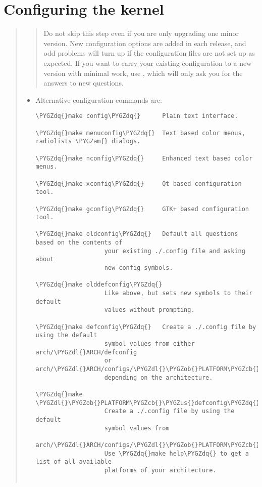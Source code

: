\documentclass[a4paper,8pt,english]{sphinxmanual}
\def\PYGZus{\char`\_}
\def\PYGZob{\char`\{}
\def\PYGZcb{\char`\}}
\def\PYGZam{\char`\&}
\def\PYGZdl{\char`\$}
\def\PYGZdq{\char`\"}
\begin{document}
\section{Configuring the kernel}
\label{admin-guide/README:configuring-the-kernel}\begin{quote}
\begin{quote}

Do not skip this step even if you are only upgrading one minor
version.  New configuration options are added in each release, and
odd problems will turn up if the configuration files are not set up
as expected.  If you want to carry your existing configuration to a
new version with minimal work, use , which will
only ask you for the answers to new questions.
\end{quote}
\begin{itemize}
\item {} 
Alternative configuration commands are:

\begin{Verbatim}[commandchars=\\\{\}]
\PYGZdq{}make config\PYGZdq{}      Plain text interface.

\PYGZdq{}make menuconfig\PYGZdq{}  Text based color menus, radiolists \PYGZam{} dialogs.

\PYGZdq{}make nconfig\PYGZdq{}     Enhanced text based color menus.

\PYGZdq{}make xconfig\PYGZdq{}     Qt based configuration tool.

\PYGZdq{}make gconfig\PYGZdq{}     GTK+ based configuration tool.

\PYGZdq{}make oldconfig\PYGZdq{}   Default all questions based on the contents of
                   your existing ./.config file and asking about
                   new config symbols.

\PYGZdq{}make olddefconfig\PYGZdq{}
                   Like above, but sets new symbols to their default
                   values without prompting.

\PYGZdq{}make defconfig\PYGZdq{}   Create a ./.config file by using the default
                   symbol values from either arch/\PYGZdl{}ARCH/defconfig
                   or arch/\PYGZdl{}ARCH/configs/\PYGZdl{}\PYGZob{}PLATFORM\PYGZcb{}\PYGZus{}defconfig,
                   depending on the architecture.

\PYGZdq{}make \PYGZdl{}\PYGZob{}PLATFORM\PYGZcb{}\PYGZus{}defconfig\PYGZdq{}
                   Create a ./.config file by using the default
                   symbol values from
                   arch/\PYGZdl{}ARCH/configs/\PYGZdl{}\PYGZob{}PLATFORM\PYGZcb{}\PYGZus{}defconfig.
                   Use \PYGZdq{}make help\PYGZdq{} to get a list of all available
                   platforms of your architecture.


\end{Verbatim}
\end{itemize}
\end{quote}
\end{document}
